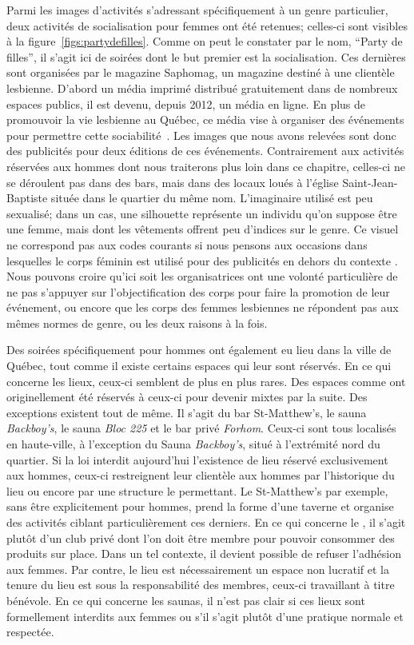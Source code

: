 Parmi les images d'activités s'adressant spécifiquement à un genre particulier, deux activités de socialisation pour femmes ont été retenues; celles-ci sont visibles à la figure~\ref{figs:partydefilles}.
Comme on peut le constater par le nom, \enquote{Party de filles}, il s'agit ici de soirées dont le but premier est la socialisation.
Ces dernières sont organisées par le magazine Saphomag, un magazine destiné à une clientèle lesbienne.
D'abord un média imprimé distribué gratuitement dans de nombreux espaces publics, il est devenu, depuis 2012, un média en ligne.
En plus de promouvoir la vie lesbienne au Québec, ce média vise à organiser des événements pour permettre cette sociabilité~\citep{Saphomag2016}.
Les images que nous avons relevées sont donc des publicités pour deux éditions de ces événements.
Contrairement aux activités réservées aux hommes dont nous traiterons plus loin dans ce chapitre, celles-ci ne se déroulent pas dans des bars, mais dans des locaux loués à l'église Saint-Jean-Baptiste située dans le quartier du même nom.
L'imaginaire utilisé est peu sexualisé; dans un cas, une silhouette représente un individu qu'on suppose être une femme, mais dont les vêtements offrent peu d'indices sur le genre.
Ce visuel ne correspond pas aux codes courants si nous pensons aux occasions dans lesquelles le corps féminin est utilisé pour des publicités en dehors du contexte \lgbt{}.
Nous pouvons croire qu'ici soit les organisatrices ont une volonté particulière de ne pas s'appuyer sur l'objectification des corps pour faire la promotion de leur événement, ou encore que les corps des femmes lesbiennes ne répondent pas aux mêmes normes de genre, ou les deux raisons à la fois.

Des soirées spécifiquement pour hommes ont également eu lieu dans la ville de Québec, tout comme il existe certains espaces qui leur sont réservés.
En ce qui concerne les lieux, ceux-ci semblent de plus en plus rares.
Des espaces comme  ont originellement été réservés à ceux-ci pour devenir mixtes par la suite.
Des exceptions existent tout de même.
Il s'agit du bar St-Matthew's, le sauna \emph{Backboy's}, le sauna \emph{Bloc 225} et le bar privé \emph{Forhom}.
Ceux-ci sont tous localisés en haute-ville, à l'exception du Sauna \emph{Backboy's}, situé à l'extrémité nord du quartier.
Si la loi interdit aujourd'hui l'existence de lieu réservé exclusivement aux hommes, ceux-ci restreignent leur clientèle aux hommes par l'historique du lieu ou encore par une structure le permettant.
Le St-Matthew's par exemple, sans être explicitement pour hommes, prend la forme d'une taverne et organise des activités ciblant particulièrement ces derniers.
En ce qui concerne le , il s'agit plutôt d'un club privé dont l'on doit être membre pour pouvoir consommer des produits sur place.
Dans un tel contexte, il devient possible de refuser l'adhésion aux femmes.
Par contre, le lieu est nécessairement un espace non lucratif et la tenure du lieu est sous la responsabilité des membres, ceux-ci travaillant à titre bénévole.
En ce qui concerne les saunas, il n'est pas clair si ces lieux sont formellement interdits aux femmes ou s'il s'agit plutôt d'une pratique normale et respectée.

